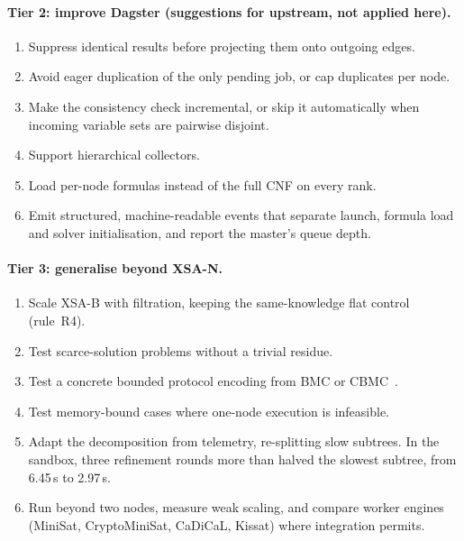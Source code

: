 \documentclass[11pt,a4paper]{article}
\newcommand{\XSA}{\textsf{XSA-N}}
\newcommand{\XSAB}{\textsf{XSA-B}}
\begin{document}
\paragraph{Tier 2: improve Dagster (suggestions for upstream, not applied here).}
\begin{enumerate}
\item Suppress identical results before projecting them onto outgoing edges.
\item Avoid eager duplication of the only pending job, or cap duplicates per node.
\item Make the consistency check incremental, or skip it automatically when incoming
      variable sets are pairwise disjoint.
\item Support hierarchical collectors.
\item Load per-node formulas instead of the full CNF on every rank.
\item Emit structured, machine-readable events that separate launch, formula load and
      solver initialisation, and report the master's queue depth.
\end{enumerate}

\paragraph{Tier 3: generalise beyond \XSA{}.}
\begin{enumerate}
\item Scale \XSAB{} with filtration, keeping the same-knowledge flat control (rule~R4).
\item Test scarce-solution problems without a trivial residue.
\item Test a concrete bounded protocol encoding from BMC or
      CBMC~\cite{biere1999bmc,clarke2004cbmc}.
\item Test memory-bound cases where one-node execution is infeasible.
\item Adapt the decomposition from telemetry, re-splitting slow subtrees. In the sandbox,
      three refinement rounds more than halved the slowest subtree, from 6.45\,s to 2.97\,s.
\item Run beyond two nodes, measure weak scaling, and compare worker engines (MiniSat,
      CryptoMiniSat, CaDiCaL, Kissat) where integration permits.
\end{enumerate}

\appendix
\end{document}
